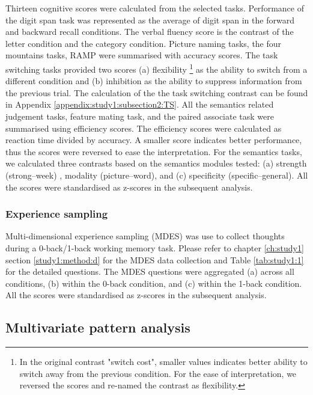 Thirteen cognitive scores were calculated from the selected tasks. Performance of the digit span task was represented as the average of digit span in the forward and backward recall conditions. The verbal fluency score is the contrast of the letter condition and the category condition. Picture naming tasks, the four mountains tasks, RAMP were summarised with accuracy scores. The task switching tasks provided two scores (a) flexibility
\footnote{
In the original contrast "switch cost", smaller values indicates better ability to switch away from the previous condition. For the ease of interpretation, we reversed the scores and re-named the contrast as flexibility.} 
as the ability to switch from a different condition and (b) inhibition as the ability to suppress information from the previous trial. The calculation of the the task switching contrast can be found in Appendix \ref{appendix:study1:subsection2:TS}. All the semantics related judgement tasks, feature mating task, and the paired associate task were summarised using efficiency scores. The efficiency scores were calculated as reaction time divided by accuracy. A smaller score indicates better performance, thus the scores were reversed to ease the interpretation. For the semantics tasks, we calculated three contrasts based on the semantics modules tested: (a) strength (strong--week) , modality (picture--word), and (c) specificity (specific--general). All the scores were standardised as z-scores in the subsequent analysis. 

\subsubsection{Experience sampling}
\label{study3:method:e:mdes}
Multi-dimensional experience sampling (MDES) was use to collect thoughts during a 0-back/1-back working memory task. Please refer to chapter \ref{ch:study1} section \ref{study1:method:d} for the MDES data collection and Table \ref{tab:study1:1} for the detailed questions. The MDES questions were aggregated (a) across all conditions, (b) within the 0-back condition, and (c) within the 1-back condition. All the scores were standardised as z-scores in the subsequent analysis.  

\subsection{Multivariate pattern analysis}
\label{study3:method:f}
